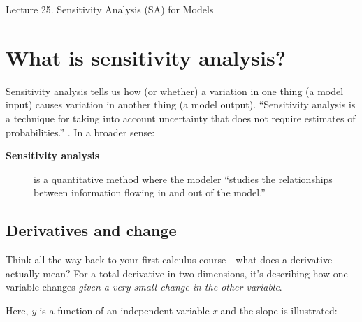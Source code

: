 \documentclass[10pt]{article}
\begin{document}
   \noindent
   \begin{center}

   \hrulefill
   
   \vspace{5pt}
   
   \vspace{0pt}
   
   {\Large \hfill  Lecture 25.  
Sensitivity Analysis (SA) for Models
}
   \vspace{5pt}
   
  
   \hrulefill
   \end{center}
   
 {}


\section{What is sensitivity analysis?}


Sensitivity analysis tells us how (or whether) a variation in one thing (a model input) causes variation in another thing (a model output). ``Sensitivity analysis is a technique for taking into account uncertainty that does not require estimates of probabilities.'' \cite{Goswami2007-hf}. In a broader sense:

\begin{description}
\item [\textbf{Sensitivity analysis}] is a quantitative method where the modeler ``studies the relationships between information flowing in and out of the model.'' \cite{Saltelli2009-tz}
\end{description}

\subsection{Derivatives and change}

Think all the way back to your first calculus course---what does a derivative actually mean? For a total derivative in two dimensions, it's describing how one variable changes \textit{given a very small change in the other variable}. 

Here, \textit{y} is a function of an independent variable \textit{x} and the slope is illustrated:
\end{document}
